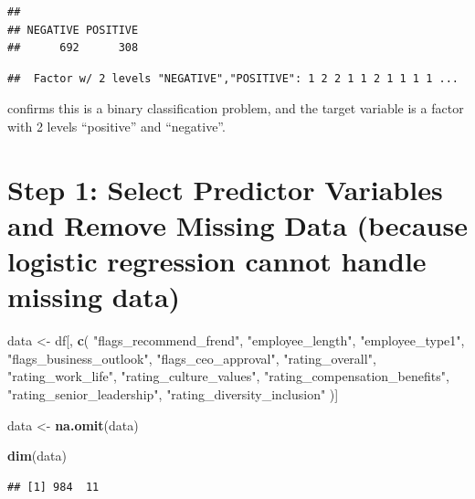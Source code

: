 \documentclass[
]{article}
\newenvironment{Shaded}{\begin{snugshade}}{\end{snugshade}}
\newcommand{\FunctionTok}[1]{\textcolor[rgb]{0.13,0.29,0.53}{\textbf{#1}}}
\newcommand{\NormalTok}[1]{#1}
\newcommand{\OtherTok}[1]{\textcolor[rgb]{0.56,0.35,0.01}{#1}}
\newcommand{\SpecialCharTok}[1]{\textcolor[rgb]{0.81,0.36,0.00}{\textbf{#1}}}
\newcommand{\StringTok}[1]{\textcolor[rgb]{0.31,0.60,0.02}{#1}}
\begin{document}
\begin{verbatim}
## 
## NEGATIVE POSITIVE 
##      692      308
\end{verbatim}

\begin{Shaded}
\end{Shaded}

\begin{verbatim}
##  Factor w/ 2 levels "NEGATIVE","POSITIVE": 1 2 2 1 1 2 1 1 1 1 ...
\end{verbatim}

confirms this is a binary classification problem, and the target
variable is a factor with 2 levels ``positive'' and ``negative''.

\section{Step 1: Select Predictor Variables and Remove Missing Data
(because logistic regression cannot handle missing
data)}\label{step-1-select-predictor-variables-and-remove-missing-data-because-logistic-regression-cannot-handle-missing-data}

\begin{Shaded}
\begin{Highlighting}[]
\NormalTok{data }\OtherTok{\textless{}{-}}\NormalTok{ df[, }\FunctionTok{c}\NormalTok{(}
\StringTok{"flags\_recommend\_frend"}\NormalTok{, }
\StringTok{"employee\_length"}\NormalTok{,}
\StringTok{"employee\_type1"}\NormalTok{,}
\StringTok{"flags\_business\_outlook"}\NormalTok{,}
\StringTok{"flags\_ceo\_approval"}\NormalTok{,}
\StringTok{"rating\_overall"}\NormalTok{,}
\StringTok{"rating\_work\_life"}\NormalTok{,}
\StringTok{"rating\_culture\_values"}\NormalTok{,}
\StringTok{"rating\_compensation\_benefits"}\NormalTok{,}
\StringTok{"rating\_senior\_leadership"}\NormalTok{,}
\StringTok{"rating\_diversity\_inclusion"}
\NormalTok{)]}

\NormalTok{data }\OtherTok{\textless{}{-}} \FunctionTok{na.omit}\NormalTok{(data)}

\FunctionTok{dim}\NormalTok{(data)}
\end{Highlighting}
\end{Shaded}

\begin{verbatim}
## [1] 984  11
\end{verbatim}
\end{document}
